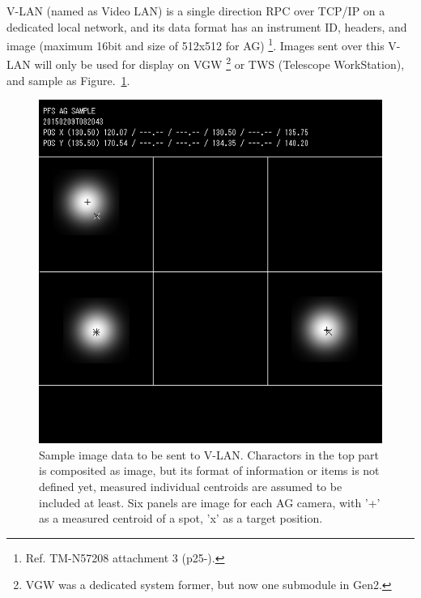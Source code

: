 \documentclass[a4paper,notitlepage]{article}
\begin{document}
V-LAN (named as Video LAN) is a single direction RPC over TCP/IP on a dedicated 
local network, and its data format has an instrument ID, headers, and image 
(maximum 16bit and size of 512x512 for AG)
\footnote{Ref. TM-N57208 attachment 3 (p25-).}.
Images sent over this V-LAN will only be used for display on VGW
\footnote{VGW was a dedicated system former, but now one submodule in Gen2. }
or TWS (Telescope WorkStation), and sample as Figure.~\ref{fig:vlan-image}. 

\begin{figure}[htb]
  \begin{center}
    \includegraphics{VLAN-image.png}
  \end{center}
  \caption{Sample image data to be sent to V-LAN.
    Charactors in the top part is composited as image, but its format of 
    information or items is not defined yet, measured individual centroids 
    are assumed to be included at least. 
    Six panels are image for each AG camera, with '+' as a measured centroid 
    of a spot, 'x' as a target position. 
  }
  \label{fig:vlan-image}
\end{figure}
\end{document}
